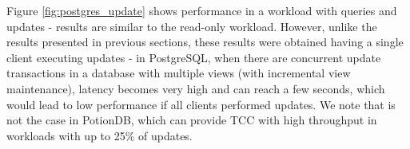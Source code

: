 \documentclass[sigplan,twocolumn,review,anonymous]{acmart}
\begin{document}
Figure \ref{fig:postgres_update} shows performance in a workload with queries and updates - results are similar to
the read-only workload. 
However, unlike the results presented in previous sections, these results were obtained having a single client executing
updates - in PostgreSQL, when there are concurrent update transactions in a database with multiple views (with incremental view maintenance), 
latency becomes very high and can reach a few seconds, which would lead to low performance if all clients performed updates. 
We note that is not the case in PotionDB, which can provide TCC with high throughput in workloads with up to 25\% of updates.



\end{document}
